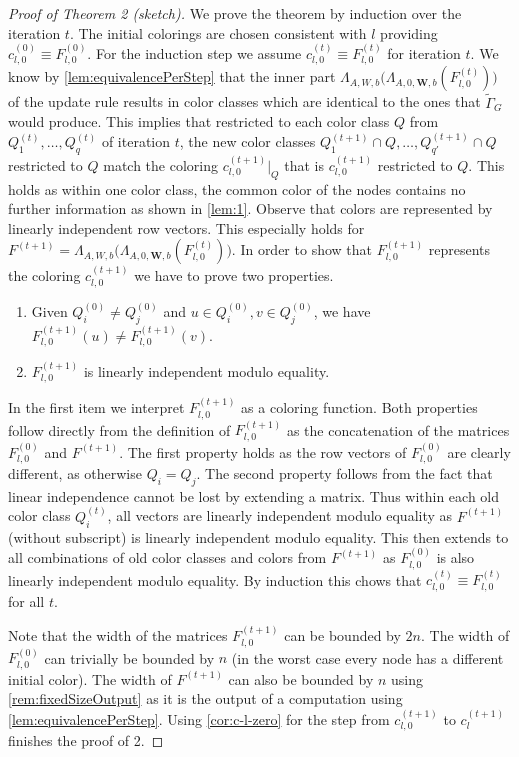 \documentclass[letterpaper]{article}
\theoremstyle{definition}
\renewcommand{\vec}[1]{\mathbf{#1}}
\begin{document}
\begin{proof}[Proof of Theorem 2 (sketch)]
	We prove the theorem by induction over the iteration $t$.
	The initial colorings are chosen consistent with $l$ providing  $c_{l,0}^{(0)} \equiv F^{(0)}_{l,0}$.
	For the induction step we assume $c_{l,0}^{(t)} \equiv F^{(t)}_{l,0}$ for iteration $t$.
	We know by \cref{lem:equivalencePerStep} that the inner part $\Lambda_{A,W,b}\big(\Lambda_{A,0,\vec W,b} (F^{(t)}_{l,0})\big)$ of the update rule results in color classes which are identical to the ones that $\tilde\Gamma_G$ would produce.
	This implies that restricted to each color class $Q$ from $Q_1^{(t)},\dots,Q_q^{(t)}$ of iteration $t$, the new color classes $Q_1^{(t+1)}\cap Q,\dots,Q_{q'}^{(t+1)}\cap Q$ restricted to $Q$ match the coloring $c_{l,0}^{(t+1)}|_Q$ that is $c_{l,0}^{(t+1)}$ restricted to $Q$.
	This holds as within one color class, the common color of the nodes contains no further information as shown in \cref{lem:1}.
	Observe that colors are represented by linearly independent row vectors.
	This especially holds for $F^{(t+1)} = \Lambda_{A,W,b}\big(\Lambda_{A,0,\vec W,b} (F^{(t)}_{l,0})\big)$.
	In order to show that $F^{(t+1)}_{l,0}$ represents the coloring $c^{(t+1)}_{l,0}$ we have to prove two properties.
	\begin{enumerate}
		\item Given $Q_i^{(0)} \neq Q_j^{(0)}$ and $u\in Q_i^{(0)}, v\in Q_j^{(0)}$, we have $F^{(t+1)}_{l,0}(u)\neq F^{(t+1)}_{l,0}(v)$.
		\item $F^{(t+1)}_{l,0}$ is linearly independent modulo equality.
	\end{enumerate}
	In the first item we interpret $F^{(t+1)}_{l,0}$ as a coloring function. Both properties follow directly from the definition of $F^{(t+1)}_{l,0}$ as the concatenation of the matrices $F^{(0)}_{l,0}$ and $F^{(t+1)}$.
	The first property holds as the row vectors of $F^{(0)}_{l,0}$ are clearly different, as otherwise $Q_i=Q_j$.
	The second property follows from the fact that linear independence cannot be lost by extending a matrix.
	Thus within each old color class $Q_i^{(t)}$, all vectors are linearly independent modulo equality as $F^{(t+1)}$ (without subscript) is linearly independent modulo equality.
	This then extends to all combinations of old color classes and colors from $F^{(t+1)}$ as $F^{(0)}_{l,0}$ is also linearly independent modulo equality.
	By induction this chows that $c_{l,0}^{(t)} \equiv F^{(t)}_{l,0}$ for all $t$.
				
	Note that the width of the matrices $F^{(t+1)}_{l,0}$ can be bounded by $2n$.
	The width of $F^{(0)}_{l,0}$ can trivially be bounded by $n$ (in the worst case every node has a different initial color).
	The width of $F^{(t+1)}$ can also be bounded by $n$ using \cref{rem:fixedSizeOutput} as it is the output of a computation using \cref{lem:equivalencePerStep}. Using \cref{cor:c-l-zero} for the step from $c^{(t+1)}_{l,0}$ to $c^{(t+1)}_{l}$ finishes the proof of 2.
\end{proof}
\end{document}
